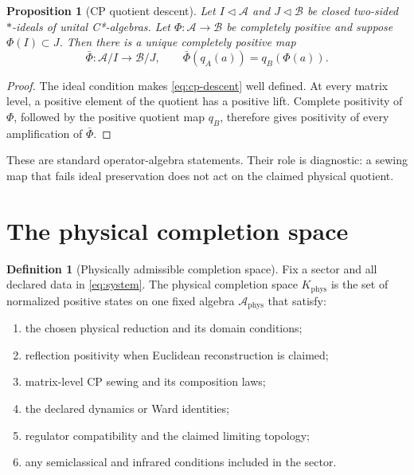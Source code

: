 \documentclass[11pt,a4paper]{article}
\newtheorem{proposition}[theorem]{Proposition}
\theoremstyle{definition}
\newtheorem{definition}[theorem]{Definition}
\theoremstyle{remark}
\newcommand{\A}{\mathcal A}
\newcommand{\Kphys}{K_{\mathrm{phys}}}
\begin{document}
\begin{proposition}[CP quotient descent]
Let $I\triangleleft\A$ and $J\triangleleft\mathcal B$ be closed two-sided
$*$-ideals of unital C*-algebras.  Let $\Phi:\A\to\mathcal B$ be completely
positive and suppose $\Phi(I)\subset J$.  Then there is a unique completely
positive map
\begin{equation}
   \bar\Phi:\A/I\longrightarrow\mathcal B/J,\qquad
   \bar\Phi(q_A(a))=q_B(\Phi(a)).
   \label{eq:cp-descent}
\end{equation}
\end{proposition}

\begin{proof}
The ideal condition makes \eqref{eq:cp-descent} well defined.  At every matrix
level, a positive element of the quotient has a positive lift.  Complete
positivity of $\Phi$, followed by the positive quotient map $q_B$, therefore
gives positivity of every amplification of $\bar\Phi$.
\end{proof}

These are standard operator-algebra statements.  Their role is diagnostic: a
sewing map that fails ideal preservation does not act on the claimed physical
quotient.


\section{The physical completion space}

\begin{definition}[Physically admissible completion space]
Fix a sector and all declared data in \eqref{eq:system}.  The physical
completion space $\Kphys$ is the set of normalized positive states on one
fixed algebra $\A_{\mathrm{phys}}$ that satisfy:
\begin{enumerate}[label=(\roman*)]
 \item the chosen physical reduction and its domain conditions;
 \item reflection positivity when Euclidean reconstruction is claimed;
 \item matrix-level CP sewing and its composition laws;
 \item the declared dynamics or Ward identities;
 \item regulator compatibility and the claimed limiting topology;
 \item any semiclassical and infrared conditions included in the sector.
\end{enumerate}
\end{definition}
\end{document}
